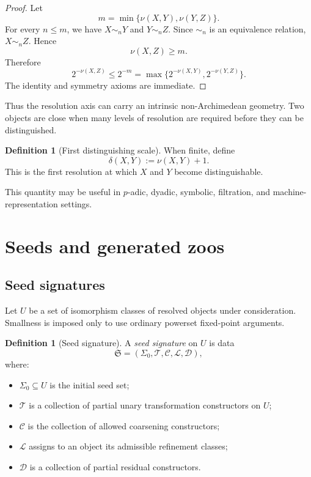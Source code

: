 \documentclass[11pt]{article}
\theoremstyle{definition}
\newtheorem{definition}[theorem]{Definition}
\theoremstyle{remark}
\newcommand{\Seeds}{\Sigma}
\begin{document}
\begin{proof}
Let
\[
m=\min\{\nu(X,Y),\nu(Y,Z)\}.
\]
For every $n\le m$, we have $X\sim_nY$ and $Y\sim_nZ$. Since $\sim_n$ is an equivalence relation, $X\sim_nZ$. Hence
\[
\nu(X,Z)\ge m.
\]
Therefore
\[
2^{-\nu(X,Z)}
\le
2^{-m}
=
\max\{2^{-\nu(X,Y)},2^{-\nu(Y,Z)}\}.
\]
The identity and symmetry axioms are immediate.
\end{proof}

Thus the resolution axis can carry an intrinsic non-Archimedean geometry. Two objects are close when many levels of resolution are required before they can be distinguished.

\begin{definition}[First distinguishing scale]
When finite, define
\[
\delta(X,Y):=\nu(X,Y)+1.
\]
This is the first resolution at which $X$ and $Y$ become distinguishable.
\end{definition}

This quantity may be useful in $p$-adic, dyadic, symbolic, filtration, and machine-representation settings.

\section{Seeds and generated zoos}

\subsection{Seed signatures}

Let $U$ be a set of isomorphism classes of resolved objects under consideration. Smallness is imposed only to use ordinary powerset fixed-point arguments.

\begin{definition}[Seed signature]
A \emph{seed signature} on $U$ is data
\[
\mathfrak S=(\Seeds_0,\mathscr T,\mathscr C,\mathscr L,\mathscr D),
\]
where:
\begin{itemize}
    \item $\Seeds_0\subseteq U$ is the initial seed set;
    \item $\mathscr T$ is a collection of partial unary transformation constructors on $U$;
    \item $\mathscr C$ is the collection of allowed coarsening constructors;
    \item $\mathscr L$ assigns to an object its admissible refinement classes;
    \item $\mathscr D$ is a collection of partial residual constructors.
\end{itemize}
\end{definition}
\end{document}
